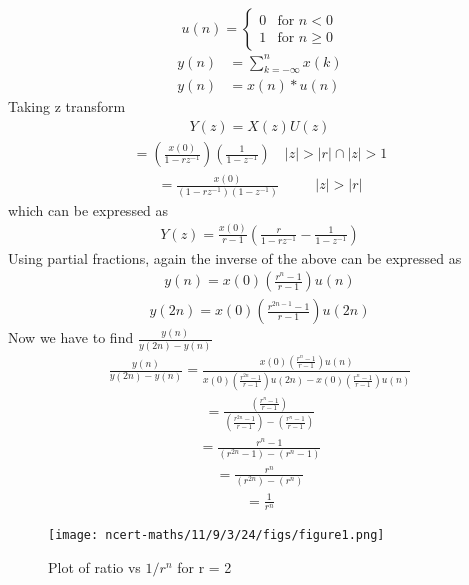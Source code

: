 \documentclass[journal,12pt,twocolumn]{IEEEtran}
\theoremstyle{remark}
\begin{document}
\[
u(n) = 
\begin{cases} 
0 & \text{for } n < 0 \\
1 & \text{for } n \geq 0 
\end{cases}
\]
\begin{align}
y(n) &= \sum_{k=-\infty}^{n} x(k) \\
y(n) &= x(n)*u(n)
\end{align}
Taking z transform
\begin{align}
Y(z) = X(z)U(z)
\end{align}
\begin{align}
= \left(\frac{x(0)}{1 - rz^{-1}}\right) \left(\frac{1}{1 - z^{-1}}\right)  \quad |z| > |r| \cap |z| > 1
\end{align}
\begin{align}
= \frac{x(0)}{(1 - rz^{-1})(1 - z^{-1})} && \quad |z| > |r|
\end{align}
which can be expressed as
\begin{align}
Y(z) = \frac{x(0)}{r-1} \left(\frac{r}{1-rz^{-1}} - \frac{1}{1-z^{-1}}\right)
\end{align}
Using partial fractions, again the inverse of the above can be expressed as 
\begin{align}
y(n) = x(0)\left(\frac{r^{n}-1}{r-1}\right)u(n)
\end{align}
\begin{align}
y(2n) = x(0)\left(\frac{r^{2n-1}-1}{r-1}\right)u(2n)
\end{align}
Now we have to find $\frac{y(n)}{y(2n)-y(n)}$
\begin{align}
\frac{y(n)}{y(2n)-y(n)} = \frac{x(0)\left(\frac{r^{n}-1}{r-1}\right)u(n)}{x(0)\left(\frac{r^{2n}-1}{r-1}\right)u(2n)- x(0)\left(\frac{r^{n}-1}{r-1}\right)u(n)}
\end{align}
\begin{align}
 = \frac{\left(\frac{r^{n}-1}{r-1}\right)}{\left(\frac{r^{2n}-1}{r-1}\right)- \left(\frac{r^{n}-1}{r-1}\right)}
\end{align}
\begin{align}
= \frac{r^{n}-1}{(r^{2n}-1)- (r^{n}-1)}
\end{align}
\begin{align}
= \frac{r^{n}}{(r^{2n})- (r^{n})}
\end{align}
\begin{align}
= \frac{1}{r^{n}}
\end{align}
\begin{figure}[!ht]
\centering
\begin{center}
\texttt{[image: ncert-maths/11/9/3/24/figs/figure1.png]}
\caption{Plot of ratio vs $1/r^n$ for r = 2}
\end{center}
\end{figure}

\end{document}

